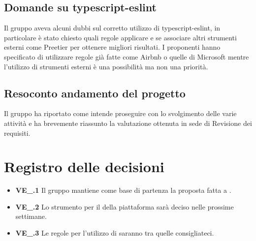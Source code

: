 \subsection{Domande su typescript-eslint}
Il gruppo aveva alcuni dubbi sul corretto utilizzo di typescript-eslint, in particolare è stato chiesto quali regole applicare e se associare altri strumenti esterni come Preetier per ottenere migliori risultati. I proponenti hanno specificato di utilizzare regole già fatte come Airbnb o quelle di Microsoft mentre l'utilizzo di strumenti esterni è una possibilità ma non una priorità.
\subsection{Resoconto andamento del progetto}
Il gruppo ha riportato come intende proseguire con lo svolgimento delle varie attività e ha brevemente riassunto la valutazione ottenuta in sede di Revisione dei requisiti. 

\section{Registro delle decisioni}
\begin{itemize}
	\item \textbf{VE\_\Data.1} Il gruppo mantiene come base di partenza la proposta fatta a \Proponente.
   \item \textbf{VE\_\Data.2} Lo strumento per il  della piattaforma sarà deciso nelle prossime settimane.
   \item \textbf{VE\_\Data.3} Le regole per l'utilizzo di  saranno tra quelle consigliateci.
\end{itemize}